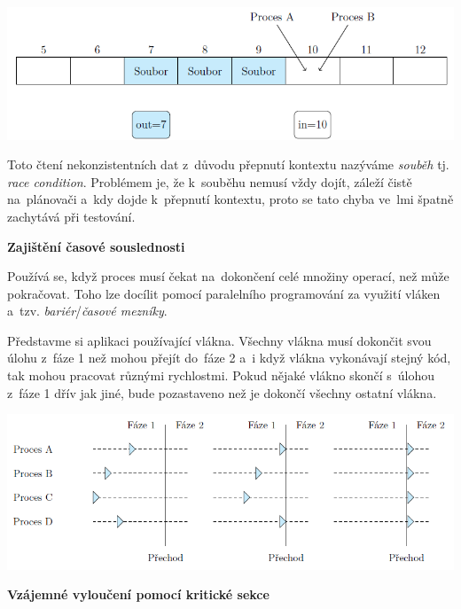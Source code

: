 \begin{center}
    \includegraphics[scale=1]{images/proc_soubeh.png}
\end{center}

Toto čtení nekonzistentních dat z~důvodu přepnutí kontextu nazýváme \emph{souběh} tj. \emph{race condition}. Problémem je, že k~souběhu nemusí vždy dojít, záleží čistě na~plánovači a~kdy dojde k~přepnutí kontextu, proto se tato chyba ve~lmi špatně zachytává při testování. 

\begin{large}
    \vspace{0,5cm}
    \textbf{Zajištění časové souslednosti}
\end{large}

Používá se, když proces musí čekat na~dokončení celé množiny operací, než může pokračovat. Toho lze docílit pomocí paralelního programování za využití vláken a~tzv. \emph{bariér}/\emph{časové mezníky}. 

\vspace{0,5cm}

Představme si aplikaci používající vlákna. Všechny vlákna musí dokončit svou úlohu z~fáze 1 než mohou přejít do~fáze 2 a~i když vlákna vykonávají stejný kód, tak mohou pracovat různými rychlostmi. Pokud nějaké vlákno skončí s~úlohou z~fáze 1 dřív jak jiné, bude pozastaveno než je dokončí všechny ostatní vlákna.

\begin{center}
    \includegraphics[scale=1]{images/proc_barrier.png}
\end{center}

\begin{large}
    \vspace{0,5cm}
    \textbf{Vzájemné vyloučení pomocí kritické sekce}
\end{large}

